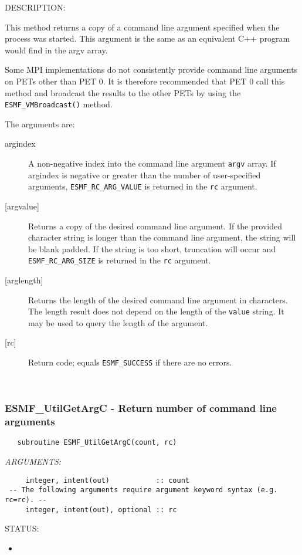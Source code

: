 {\sf DESCRIPTION:\\ }


   This method returns a copy of a command line argument specified
   when the process was started.  This argument is the same as an
   equivalent C++ program would find in the argv array.
  
   Some MPI implementations do not consistently provide command line
   arguments on PETs other than PET 0.  It is therefore recommended
   that PET 0 call this method and broadcast the results to the other
   PETs by using the {\tt ESMF\_VMBroadcast()} method.
  
   The arguments are:
  
   \begin{description}
   \item [{argindex}]
   A non-negative index into the command line argument {\tt argv} array.
   If argindex is negative or greater than the number of user-specified
   arguments, {\tt ESMF\_RC\_ARG\_VALUE} is returned in the {\tt rc} argument.
   \item [{[argvalue]}]
   Returns a copy of the desired command line argument.  If the provided
   character string is longer than the command line argument, the string
   will be blank padded.  If the string is too short, truncation will
   occur and {\tt ESMF\_RC\_ARG\_SIZE} is returned in the {\tt rc} argument.
   \item [{[arglength]}]
   Returns the length of the desired command line argument in characters.
   The length result does not depend on the length of the {\tt value}
   string.  It may be used to query the length of the argument.
   \item [{[rc]}]
   Return code; equals {\tt ESMF\_SUCCESS} if there are no errors.
   \end{description} 
 
\mbox{}\hrulefill\ 
 
\subsubsection [ESMF\_UtilGetArgC] {ESMF\_UtilGetArgC - Return number of command line arguments}


  
\begin{verbatim}   subroutine ESMF_UtilGetArgC(count, rc)\end{verbatim}{\em ARGUMENTS:}
\begin{verbatim}     integer, intent(out)           :: count
 -- The following arguments require argument keyword syntax (e.g. rc=rc). --
     integer, intent(out), optional :: rc\end{verbatim}
{\sf STATUS:}
   \begin{itemize}
   \item{}
   \end{itemize}
  
